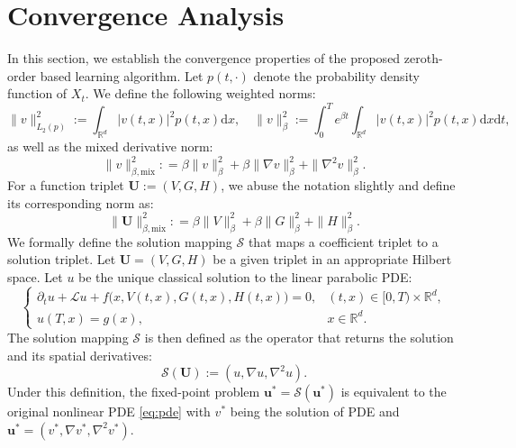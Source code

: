 \documentclass[twoside,11pt]{article}
\newcommand{\dd}{\mathrm{d}}
\newcommand{\R}{\mathbb{R}}
\newcommand{\1}{\mathbf{1}}
\numberwithin{equation}{section}
\begin{document}
\section{Convergence Analysis}
\label{sec:convergence analysis}
In this section, we establish the convergence properties of the proposed zeroth-order based learning algorithm. Let $p(t,\cdot)$ denote the probability density function of $X_t$. We define the following weighted norms:
\begin{equation}
    \|v\|_{L_2(p)}^2 := \int_{\R^d} |v(t,x)|^2p(t,x)\dd x, \quad\|v\|_{\beta}^2 := \int_0^T e^{\beta t}\int_{\R^d} |v(t,x)|^2p(t,x)\dd x\dd t,
\end{equation}
as well as the mixed derivative norm:
\begin{equation}
    \|v\|^2_{\beta, \text{mix}}: = \beta \|v\|_{\beta}^2 + \beta\|\nabla v\|_{\beta}^2 + \|\nabla^2 v\|_{\beta}^2.
\end{equation}
For a function triplet $\mathbf{U} := (V, G, H)$, we abuse the notation slightly and define its corresponding norm as:
\begin{equation}
    \|\mathbf{U}\|_{\beta, \text{mix}}^2 : = \beta \|V\|_{\beta}^2 + \beta\|G\|_{\beta}^2 + \|H\|_{\beta}^2.
\end{equation}
We formally define the solution mapping $\mathcal{S}$ that maps a coefficient triplet to a solution triplet. Let $\mathbf{U} = (V, G, H)$ be a given triplet in an appropriate Hilbert space. Let $u$ be the unique classical solution to the linear parabolic PDE:
\begin{equation} \label{eq: linearized_pde_step}
    \begin{cases}
        \partial_t u + \mathcal{L}u + f\big(x, V(t,x), G(t,x), H(t,x)\big) = 0, & (t,x) \in [0,T) \times \mathbb{R}^d, \\
        u(T,x) = g(x), & x \in \mathbb{R}^d.
    \end{cases}
\end{equation}
The solution mapping $\mathcal{S}$ is then defined as the operator that returns the solution and its spatial derivatives:
\begin{equation}
    \mathcal{S}(\mathbf{U}) := (u, \nabla u, \nabla^2 u).
\end{equation}
Under this definition, the fixed-point problem $\mathbf{u}^* = \mathcal{S}(\mathbf{u}^*)$ is equivalent to the original nonlinear PDE \eqref{eq:pde} with $ v^*$ being the solution of PDE and $ \mathbf{u}^* = (v^*, \nabla v^*, \nabla^2 v^*)$.
\end{document}
